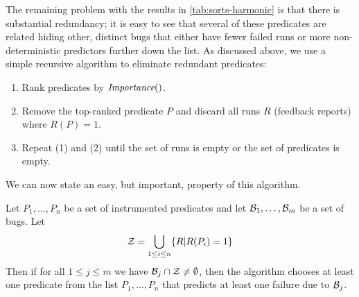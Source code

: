 The remaining problem with the results in \autoref{tab:sorts-harmonic}
is that there is substantial redundancy; it is easy to see that several of these
predicates are related hiding other, distinct bugs that either have
fewer failed runs or more non-deterministic predictors further down the
list.  As discussed above, we use a simple recursive algorithm to eliminate
redundant predicates:
\begin{enumerate}

\item Rank predicates by $\textit{Importance}()$.

\item Remove the top-ranked predicate $P$ and discard all runs $R$ (feedback reports) where  $R(P) = 1$.

\item Repeat (1) and (2) until the set of runs is empty or the set of predicates is empty.
\end{enumerate}


We can now state an easy, but important, property of this algorithm.  
\begin{lemma}
\rm
Let $P_1,\ldots,P_n$ be a set of instrumented predicates and let ${\cal B}_1,\ldots,{\cal B}_m$ be a set of bugs.  Let
\[ {\cal Z} = \bigcup_{1 \leq i \leq n} \{ R | R(P_i) = 1 \} \]
Then if for all $1 \leq j \leq m$ we have ${\cal B}_j \cap {\cal Z} \neq \emptyset$, then 
the algorithm chooses at least one predicate from the list $P_1,\ldots,P_n$ that predicts
at least one failure due to ${\cal B}_j$.
\end{lemma}


